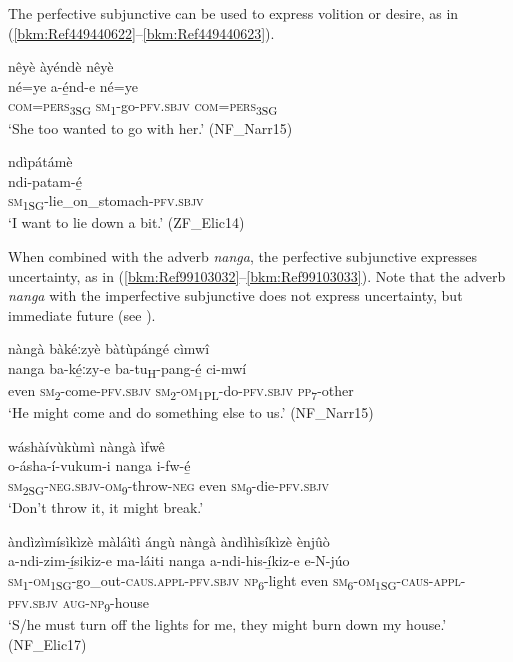The perfective subjunctive can be used to express volition or desire, as in (\ref{bkm:Ref449440622}--\ref{bkm:Ref449440623}).

\ea
\label{bkm:Ref449440622}
nêyè àyéndè nêyè\\
\gll né=ye    a-é̲nd-e    né=ye\\
\textsc{com}=\textsc{pers}\textsubscript{3SG}  \textsc{sm}\textsubscript{1}-go-\textsc{pfv}.\textsc{sbjv}  \textsc{com}=\textsc{pers}\textsubscript{3SG}\\
\glt ‘She too wanted to go with her.’ (NF\_Narr15)
\z

\ea
\label{bkm:Ref449440623}
\glll ndìpátámè\\
ndi-patam-é̲\\
\textsc{sm}\textsubscript{1SG}-lie\_on\_stomach-\textsc{pfv}.\textsc{sbjv}\\
\glt ‘I want to lie down a bit.’ (ZF\_Elic14)
\z

When combined with the adverb \textit{nanga}, the perfective subjunctive expresses uncertainty, as in (\ref{bkm:Ref99103032}--\ref{bkm:Ref99103033}). Note that the adverb \textit{nanga} with the imperfective subjunctive does not express uncertainty, but immediate future (see ).

\ea
\label{bkm:Ref99103032}
nàngà bàkéːzyè bàtùpángé cìmwî\\
\gll nanga  ba-ké̲ːzy-e    ba-tu\textsubscript{H}-pang-é̲    ci-mwí\\
even  \textsc{sm}\textsubscript{2}-come-\textsc{pfv}.\textsc{sbjv}  \textsc{sm}\textsubscript{2}-\textsc{om}\textsubscript{1PL}-do-\textsc{pfv}.\textsc{sbjv}  \textsc{pp}\textsubscript{7}-other\\
\glt ‘He might come and do something else to us.’ (NF\_Narr15)
\z

\ea
wáshàívùkùmì nàngà ìfwê\\
\gll o-ásha-í-vukum-i        nanga  i-fw-é̲\\
\textsc{sm}\textsubscript{2SG}-\textsc{neg}.\textsc{sbjv}-\textsc{om}\textsubscript{9}-throw-\textsc{neg}    even  \textsc{sm}\textsubscript{9}-die-\textsc{pfv}.\textsc{sbjv}\\
\glt ‘Don’t throw it, it might break.’
\z

\ea
\label{bkm:Ref99103033}
àndìzìmísìkìzè màláìtì ángù nàngà àndìhìsíkìzè ènjûò\\
\gll a-ndi-zim-í̲sikiz-e        ma-láiti nanga  a-ndi-his-í̲kiz-e      e-N-júo\\
\textsc{sm}\textsubscript{1}-\textsc{om}\textsubscript{1SG}-go\_out-\textsc{caus}.\textsc{appl}-\textsc{pfv}.\textsc{sbjv}  \textsc{np}\textsubscript{6}-light
even  \textsc{sm}\textsubscript{6}-\textsc{om}\textsubscript{1SG}-\textsc{caus}-\textsc{appl}-\textsc{pfv}.\textsc{sbjv}  \textsc{aug}-\textsc{np}\textsubscript{9}-house\\
\glt ‘S/he must turn off the lights for me, they might burn down my house.’ (NF\_Elic17)
\z

